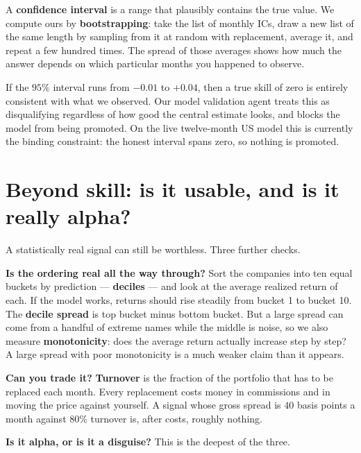 \documentclass[11pt]{article}
\begin{document}
\begin{specbox}
A \textbf{confidence interval} is a range that plausibly contains the true value. We
compute ours by \textbf{bootstrapping}: take the list of monthly ICs, draw a new list
of the same length by sampling from it at random with replacement, average it, and
repeat a few hundred times. The spread of those averages shows how much the answer
depends on which particular months you happened to observe.
\end{specbox}

\begin{keybox}
If the $95\%$ interval runs from $-0.01$ to $+0.04$, then a true skill of zero is
entirely consistent with what we observed. Our model validation agent treats this as
disqualifying regardless of how good the central estimate looks, and blocks the model
from being promoted. On the live twelve-month US model this is currently the binding
constraint: the honest interval spans zero, so nothing is promoted.
\end{keybox}

\section{Beyond skill: is it usable, and is it really alpha?}

A statistically real signal can still be worthless. Three further checks.

\textbf{Is the ordering real all the way through?} Sort the companies into ten equal
buckets by prediction --- \textbf{deciles} --- and look at the average realized return
of each. If the model works, returns should rise steadily from bucket 1 to bucket 10.
The \textbf{decile spread} is top bucket minus bottom bucket. But a large spread can
come from a handful of extreme names while the middle is noise, so we also measure
\textbf{monotonicity}: does the average return actually increase step by step? A large
spread with poor monotonicity is a much weaker claim than it appears.

\textbf{Can you trade it?} \textbf{Turnover} is the fraction of the portfolio that has
to be replaced each month. Every replacement costs money in commissions and in moving
the price against yourself. A signal whose gross spread is $40$ basis points a month
against $80\%$ turnover is, after costs, roughly nothing.

\textbf{Is it alpha, or is it a disguise?} This is the deepest of the three.
\end{document}
